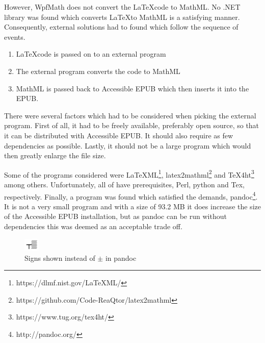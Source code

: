 However, WpfMath does not convert the \LaTeX code to MathML. No .NET library was found which converts \LaTeX to MathML is a satisfying manner. Consequently, external solutions had to found which follow the sequence of events.

\begin{enumerate}
	\item \LaTeX code is passed on to an external program
	\item The external program converts the code to MathML
	\item MathML is passed back to Accessible EPUB which then inserts it into the EPUB.
\end{enumerate}

There were several factors which had to be considered when picking the external program. First of all, it had to be freely available, preferably open source, so that it can be distributed with Accessible EPUB. It should also require as few dependencies as possible. Lastly, it should not be a large program which would then greatly enlarge the file size. 

Some of the programs considered were LaTeXML\footnote{https://dlmf.nist.gov/LaTeXML/}, latex2mathml\footnote{https://github.com/Code-ReaQtor/latex2mathml} and TeX4ht\footnote{https://www.tug.org/tex4ht/} among others. Unfortunately, all of have prerequisites, Perl, python and Tex, respectively. Finally, a program was found which satisfied the demands, pandoc\footnote{http://pandoc.org/}. It is not a very small program and with a size of 93.2 MB it does increase the size of the Accessible EPUB installation, but as pandoc can be run without dependencies this was deemed as an acceptable trade off.



\begin{figure}[h]
	\centering
	\includegraphics[width=2em]{figures/pandocSigns.png}
	\caption{Signs shown instead of $\pm$ in pandoc}
	\label{fig:signsPlusMinus}
\end{figure}

